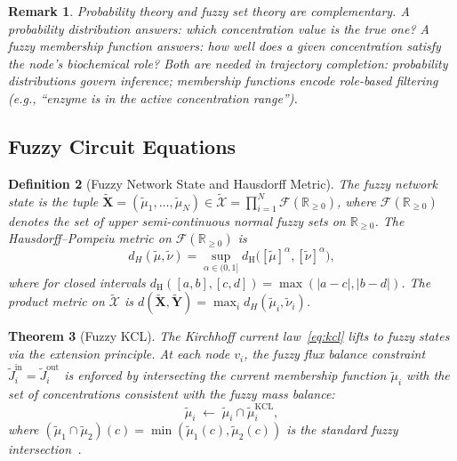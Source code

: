 \documentclass[twocolumn,10pt,a4paper]{article}
\newtheorem{theorem}{Theorem}[section]
\newtheorem{definition}[theorem]{Definition}
\newtheorem{remark}[theorem]{Remark}
\begin{document}
\begin{remark}
Probability theory and fuzzy set theory are complementary.  A probability
distribution answers: \emph{which} concentration value is the true one?  A
fuzzy membership function answers: \emph{how well} does a given concentration
satisfy the node's biochemical role?  Both are needed in trajectory completion:
probability distributions govern inference; membership functions encode
role-based filtering (e.g., ``enzyme is in the active concentration range'').
\end{remark}

\subsection{Fuzzy Circuit Equations}
\label{sec:fuzzy-circuit}

\begin{definition}[Fuzzy Network State and Hausdorff Metric]
\label{def:fuzzy-net}
The \emph{fuzzy network state} is the tuple
$\widetilde{\mathbf{X}}=(\tilde{\mu}_1,\ldots,\tilde{\mu}_N)
\in\widetilde{\mathcal{X}}=\prod_{i=1}^N\mathcal{F}(\mathbb{R}_{\geq 0})$,
where $\mathcal{F}(\mathbb{R}_{\geq 0})$ denotes the set of upper
semi-continuous normal fuzzy sets on $\mathbb{R}_{\geq 0}$.  The
\emph{Hausdorff--Pompeiu metric} on $\mathcal{F}(\mathbb{R}_{\geq 0})$
is~\cite{Hausdorff1914}
\begin{equation}
  d_H(\tilde{\mu},\tilde{\nu})=\sup_{\alpha\in(0,1]}
    d_{\mathrm{H}}\bigl([\tilde{\mu}]^\alpha,[\tilde{\nu}]^\alpha\bigr),
  \label{eq:hausdorff}
\end{equation}
where for closed intervals
$d_{\mathrm{H}}([a,b],[c,d])=\max(|a-c|,|b-d|)$.  The product metric on
$\widetilde{\mathcal{X}}$ is
$d(\widetilde{\mathbf{X}},\widetilde{\mathbf{Y}})=\max_i d_H(\tilde{\mu}_i,\tilde{\nu}_i)$.
\end{definition}

\begin{theorem}[Fuzzy KCL]
\label{thm:fuzzy-kcl}
The Kirchhoff current law~\eqref{eq:kcl} lifts to fuzzy states via the
extension principle.  At each node $v_i$, the fuzzy flux balance constraint
$\widetilde{J}_i^{\mathrm{in}}=\widetilde{J}_i^{\mathrm{out}}$ is enforced by
intersecting the current membership function $\tilde{\mu}_i$ with the set of
concentrations consistent with the fuzzy mass balance:
\begin{equation}
  \tilde{\mu}_i \;\leftarrow\; \tilde{\mu}_i \cap \tilde{\mu}_i^{\mathrm{KCL}},
  \label{eq:fuzzy-kcl}
\end{equation}
where $(\tilde{\mu}_1\cap\tilde{\mu}_2)(c)=\min(\tilde{\mu}_1(c),\tilde{\mu}_2(c))$
is the standard fuzzy intersection~\cite{Zadeh1965}.
\end{theorem}
\end{document}
